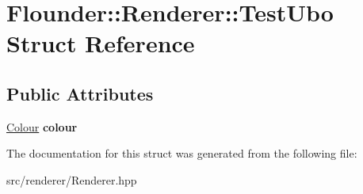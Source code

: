 \hypertarget{struct_flounder_1_1_renderer_1_1_test_ubo}{}\section{Flounder\+:\+:Renderer\+:\+:Test\+Ubo Struct Reference}
\label{struct_flounder_1_1_renderer_1_1_test_ubo}
\subsection*{Public Attributes}
\begin{DoxyCompactItemize}
\item 
\mbox{\label{struct_flounder_1_1_renderer_1_1_test_ubo_afd6922da41762acc2521da08acc691c2}} 
\hyperlink{class_flounder_1_1_colour}{Colour} {\bfseries colour}
\end{DoxyCompactItemize}


The documentation for this struct was generated from the following file\+:\begin{DoxyCompactItemize}
\item 
src/renderer/Renderer.\+hpp\end{DoxyCompactItemize}
